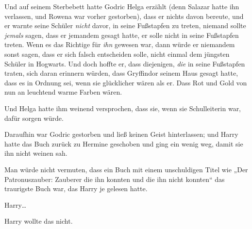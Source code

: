 Und auf seinem Sterbebett hatte Godric Helga erzählt (denn Salazar hatte ihn verlassen, und Rowena war vorher gestorben), dass er nichts davon bereute, und er warnte seine Schüler \emph{nicht} davor, in seine Fußstapfen zu treten, niemand sollte \emph{jemals} sagen, dass er jemandem gesagt hatte, er solle nicht in seine Fußstapfen treten. Wenn es das Richtige für \emph{ihn} gewesen war, dann würde er niemandem sonst sagen, dass er sich falsch entscheiden solle, nicht einmal dem jüngsten Schüler in Hogwarts. Und doch hoffte er, dass diejenigen, \emph{die} in seine Fußstapfen traten, sich daran erinnern würden, dass Gryffindor seinem Haus gesagt hatte, dass es in Ordnung sei, wenn sie glücklicher wären als er. Dass Rot und Gold von nun an leuchtend warme Farben wären.

Und Helga hatte ihm weinend versprochen, dass sie, wenn sie Schulleiterin war, dafür sorgen würde.

Daraufhin war Godric gestorben und ließ keinen Geist hinterlassen; und Harry hatte das Buch zurück zu Hermine geschoben und ging ein wenig weg, damit sie ihn nicht weinen sah.

Man würde nicht vermuten, dass ein Buch mit einem unschuldigen Titel wie „Der Patronuszauber: Zauberer die ihn konnten und die ihn nicht konnten“ das traurigste Buch war, das Harry je gelesen hatte.

Harry…

Harry wollte das nicht.


